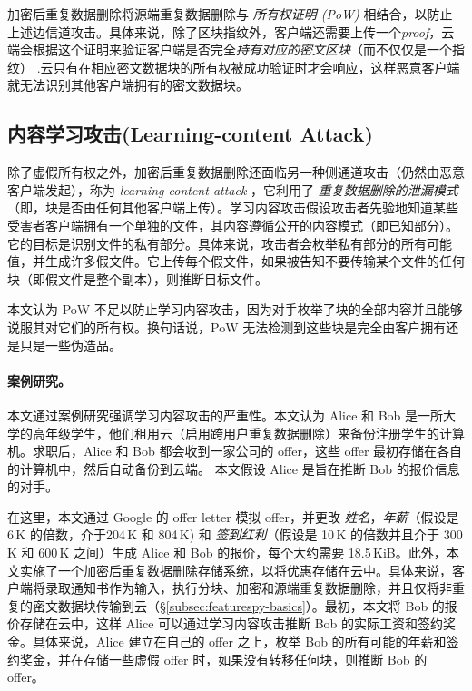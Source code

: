 加密后重复数据删除将源端重复数据删除与 {\em 所有权证明 (PoW)} \cite{halevi11} 相结合，以防止上述边信道攻击。具体来说，除了区块指纹外，客户端还需要上传一个{\em proof}，云端会根据这个证明来验证客户端是否完全{\em 持有对应的密文区块}（而不仅仅是一个指纹） .云只有在相应密文数据块的所有权被成功验证时才会响应，这样恶意客户端就无法识别其他客户端拥有的密文数据块。

\subsection{内容学习攻击(Learning-content Attack)}
\label{subsec:featurespy-attack}
除了虚假所有权之外，加密后重复数据删除还面临另一种侧通道攻击（仍然由恶意客户端发起），称为 {\em learning-content attack} \cite{harnik2010side, zuo2018mitigating}，它利用了 {\em 重复数据删除的泄漏模式}（即，块是否由任何其他客户端上传）。学习内容攻击假设攻击者先验地知道某些受害者客户端拥有一个单独的文件，其内容遵循公开的内容模式（即已知部分）。它的目标是识别文件的私有部分。具体来说，攻击者会枚举私有部分的所有可能值，并生成许多假文件。它上传每个假文件，如果被告知不要传输某个文件的任何块（即假文件是整个副本），则推断目标文件。

本文认为 PoW \cite{halevi11} 不足以防止学习内容攻击，因为对手枚举了块的全部内容并且能够说服其对它们的所有权。换句话说，PoW 无法检测到这些块是完全由客户拥有还是只是一些伪造品。

\paragraph*{案例研究。}
本文通过案例研究强调学习内容攻击的严重性。本文认为 Alice 和 Bob 是一所大学的高年级学生，他们租用云（启用跨用户重复数据删除）来备份注册学生的计算机。求职后，Alice 和 Bob 都会收到一家公司的 offer，这些 offer 最初存储在各自的计算机中，然后自动备份到云端。
本文假设 Alice 是旨在推断 Bob 的报价信息的对手。


在这里，本文通过 Google 的 offer letter \cite{GoogleOffer} 模拟 offer，并更改 \textit{姓名}，\textit{年薪}（假设是 6\,K \cite{harnik2010side} 的倍数，介于204\,K 和 804\,K) 和 \textit{签到红利}（假设是 10\,K 的倍数并且介于 300\,K 和 600\,K 之间）生成 Alice 和 Bob 的报价，每个大约需要 18.5\,KiB。此外，本文实施了一个加密后重复数据删除存储系统，以将优惠存储在云中。具体来说，客户端将录取通知书作为输入，执行分块、加密和源端重复数据删除，并且仅将非重复的密文数据块传输到云（\S\ref{subsec:featurespy-basics}）。最初，本文将 Bob 的报价存储在云中，这样 Alice 可以通过学习内容攻击推断 Bob 的实际工资和签约奖金。具体来说，Alice 建立在自己的 offer 之上，枚举 Bob 的所有可能的年薪和签约奖金，并在存储一些虚假 offer 时，如果没有转移任何块，则推断 Bob 的 offer。


